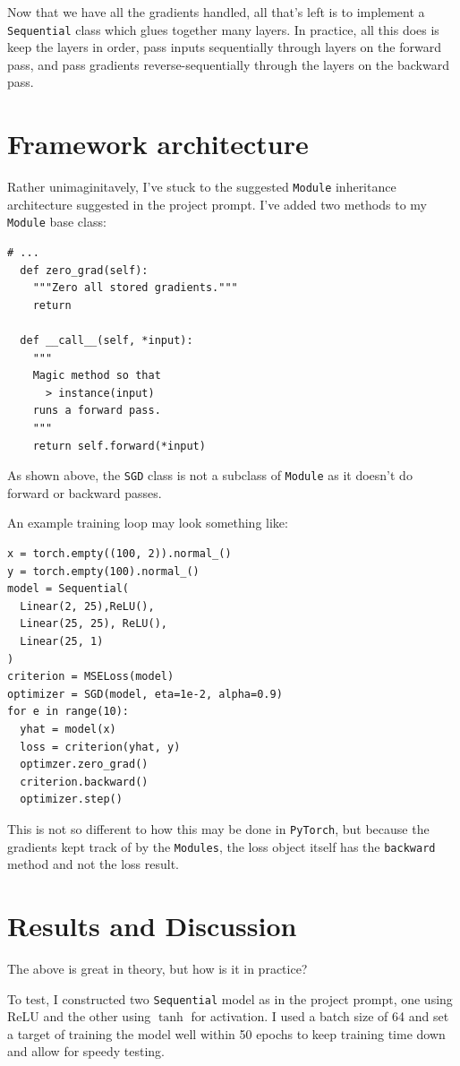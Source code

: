 \documentclass[prl, article, twocolumn]{revtex4-1}
\begin{document}
Now that we have all the gradients handled, all that's left is to implement a \texttt{Sequential} class which glues together many layers. In practice, all this does is keep the layers in order, pass inputs sequentially through layers on the forward pass, and pass gradients reverse-sequentially through the layers on the backward pass.

\section{Framework architecture}
Rather unimaginitavely, I've stuck to the suggested \texttt{Module} inheritance architecture suggested in the project prompt. I've added two methods to my \texttt{Module} base class:
\begin{verbatim}
# ...
  def zero_grad(self):
    """Zero all stored gradients."""
    return

  def __call__(self, *input):
    """
    Magic method so that
      > instance(input)
    runs a forward pass.
    """
    return self.forward(*input)
\end{verbatim}

As shown above, the \texttt{SGD} class is not a subclass of \texttt{Module} as it doesn't do forward or backward passes.

An example training loop may look something like:
\begin{verbatim}
x = torch.empty((100, 2)).normal_()
y = torch.empty(100).normal_()
model = Sequential(
  Linear(2, 25),ReLU(),
  Linear(25, 25), ReLU(),
  Linear(25, 1)
)
criterion = MSELoss(model)
optimizer = SGD(model, eta=1e-2, alpha=0.9)
for e in range(10):
  yhat = model(x)
  loss = criterion(yhat, y)
  optimzer.zero_grad()
  criterion.backward()
  optimizer.step()
\end{verbatim}
This is not so different to how this may be done in \texttt{PyTorch}, but because the gradients kept track of by the \texttt{Modules}, the loss object itself has the \texttt{backward} method and not the loss result.

\section{Results and Discussion}
The above is great in theory, but how is it in practice?

To test, I constructed two \texttt{Sequential} model as in the project prompt, one using ReLU and the other using $\tanh$ for activation. I used a batch size of 64 and set a target of training the model well within 50 epochs to keep training time down and allow for speedy testing.
\end{document}

